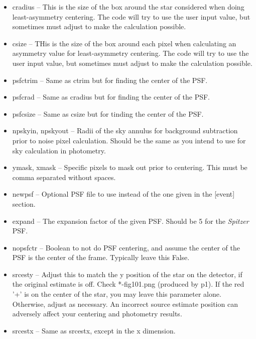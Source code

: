 \documentclass[letterpaper,12pt]{article}
\begin{document}
\begin{itemize}
\item cradius -- This is the size of the box around the star
  considered when doing least-asymmetry centering. The code will try
  to use the user input value, but sometimes must adjust to make the
  calculation possible.

\item csize -- THis is the size of the box around each pixel when
  calculating an asymmetry value for least-asymmetry centering. The
  code will try to use the user input value, but sometimes must adjust
  to make the calculation possible.

\item psfctrim -- Same as ctrim but for finding the center of the PSF.

\item psfcrad -- Same as cradius but for finding the center of the PSF.

\item psfcsize -- Same as csize but for tinding the center of the PSF.

\item npskyin, npskyout -- Radii of the sky annulus for background
  subtraction prior to noise pixel calculation. Should be the same as
  you intend to use for sky calculation in photometry.

\item ymask, xmask -- Specific pixels to mask out prior to centering.
  This must be comma separated without spaces.

\item newpsf -- Optional PSF file to use instead of the one given in the
  [event] section.

\item expand -- The expansion factor of the given PSF. Should be 5
  for the \textit{Spitzer} PSF.

\item nopsfctr -- Boolean to not do PSF centering, and assume the center of
  the PSF is the center of the frame. Typically leave this False.

\item srcesty -- Adjust this to match the y position of the star on
  the detector, if the original estimate is off. Check *-fig101.png
  (produced by p1). If the red '+' is on the center of the star, you
  may leave this parameter alone. Otherwise, adjust as necessary. An
  incorrect source estimate position can adversely affect your
  centering and photometry results.

\item srcestx -- Same as srcestx, except in the x dimension.
\end{itemize}
\end{document}
